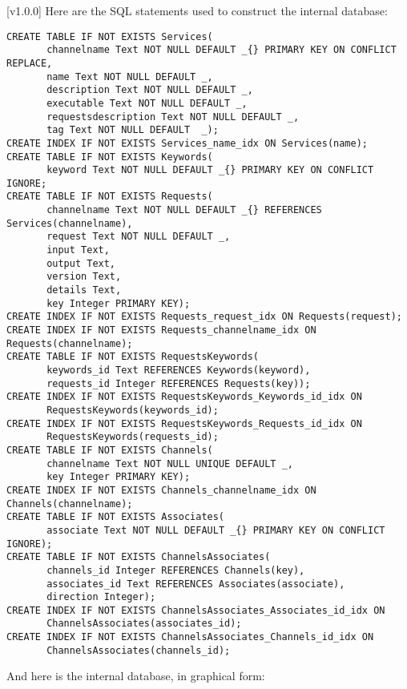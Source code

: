 [v1.0.0]
%
Here are the SQL statements used to construct the internal database:
\outputBegin{}
\begin{verbatim}
CREATE TABLE IF NOT EXISTS Services(
       channelname Text NOT NULL DEFAULT _{} PRIMARY KEY ON CONFLICT REPLACE,
       name Text NOT NULL DEFAULT _,
       description Text NOT NULL DEFAULT _,
       executable Text NOT NULL DEFAULT _,
       requestsdescription Text NOT NULL DEFAULT _,
       tag Text NOT NULL DEFAULT  _);
CREATE INDEX IF NOT EXISTS Services_name_idx ON Services(name);
CREATE TABLE IF NOT EXISTS Keywords(
       keyword Text NOT NULL DEFAULT _{} PRIMARY KEY ON CONFLICT IGNORE;
CREATE TABLE IF NOT EXISTS Requests(
       channelname Text NOT NULL DEFAULT _{} REFERENCES Services(channelname),
       request Text NOT NULL DEFAULT _,
       input Text,
       output Text,
       version Text,
       details Text,
       key Integer PRIMARY KEY);
CREATE INDEX IF NOT EXISTS Requests_request_idx ON Requests(request);
CREATE INDEX IF NOT EXISTS Requests_channelname_idx ON Requests(channelname);
CREATE TABLE IF NOT EXISTS RequestsKeywords(
       keywords_id Text REFERENCES Keywords(keyword),
       requests_id Integer REFERENCES Requests(key));
CREATE INDEX IF NOT EXISTS RequestsKeywords_Keywords_id_idx ON
       RequestsKeywords(keywords_id);
CREATE INDEX IF NOT EXISTS RequestsKeywords_Requests_id_idx ON
       RequestsKeywords(requests_id);
CREATE TABLE IF NOT EXISTS Channels(
       channelname Text NOT NULL UNIQUE DEFAULT _,
       key Integer PRIMARY KEY);
CREATE INDEX IF NOT EXISTS Channels_channelname_idx ON Channels(channelname);
CREATE TABLE IF NOT EXISTS Associates(
       associate Text NOT NULL DEFAULT _{} PRIMARY KEY ON CONFLICT IGNORE);
CREATE TABLE IF NOT EXISTS ChannelsAssociates(
       channels_id Integer REFERENCES Channels(key),
       associates_id Text REFERENCES Associates(associate),
       direction Integer);
CREATE INDEX IF NOT EXISTS ChannelsAssociates_Associates_id_idx ON
       ChannelsAssociates(associates_id);
CREATE INDEX IF NOT EXISTS ChannelsAssociates_Channels_id_idx ON
       ChannelsAssociates(channels_id);
\end{verbatim}
\outputEnd{}
\condPage{}
And here is the internal database, in graphical form:\\
\appendixEnd{}
